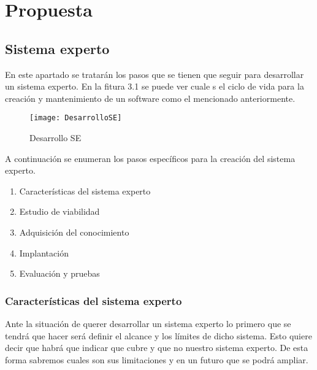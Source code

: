 \chapter{Propuesta}
\label{cap:Propuesta}

\section{Sistema experto}
En este apartado se tratarán los pasos que se tienen que seguir para desarrollar un sistema experto.
 En la fitura 3.1 se puede ver cuale s el ciclo de vida para la creación y mantenimiento de un software
 como el mencionado anteriormente.

\begin{figure}[htb]
  \centering
    \texttt{[image: DesarrolloSE]}
  \caption[Desarrollo SE]{Desarrollo SE}
  \label{fig:Desarrollo Sistema Experto}
\end{figure}

A continuación se enumeran los pasos específicos para la creación del sistema experto.
\begin{enumerate}
  \item Características del sistema experto
  \item Estudio de viabilidad
  \item Adquisición del conocimiento
  \item Implantación
  \item Evaluación y pruebas
\end{enumerate}

\subsection{Características del sistema experto}

Ante la situación de querer desarrollar un sistema experto lo primero que se tendrá
 que hacer será definir el alcance y los límites de dicho sistema. Esto quiere decir que
 habrá que indicar que cubre y que no nuestro sistema experto. De esta forma sabremos
 cuales son sus limitaciones y en un futuro que se podrá ampliar.


